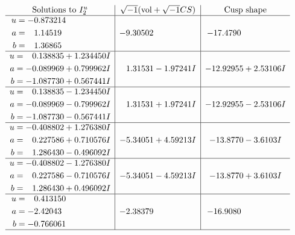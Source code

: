 \documentclass[1p]{elsarticle_modified}
\theoremstyle{definition}
\newcommand{\I}{\sqrt{-1}}
\begin{document}
$$\begin{array}{c|c|c}  
\text{Solutions to }I^u_{2}& \I (\text{vol} + \sqrt{-1}CS) & \text{Cusp shape}\\
 \hline 
\begin{aligned}
u &= -0.873214\phantom{ +0.000000I} \\
a &= \phantom{-}1.14519\phantom{ +0.000000I} \\
b &= \phantom{-}1.36865\phantom{ +0.000000I}\end{aligned}
 & -9.30502\phantom{ +0.000000I} & -17.4790\phantom{ +0.000000I} \\ \hline\begin{aligned}
u &= \phantom{-}0.138835 + 1.234450 I \\
a &= -0.089969 + 0.799962 I \\
b &= -1.087730 + 0.567441 I\end{aligned}
 & \phantom{-}1.31531 - 1.97241 I & -12.92955 + 2.53106 I \\ \hline\begin{aligned}
u &= \phantom{-}0.138835 - 1.234450 I \\
a &= -0.089969 - 0.799962 I \\
b &= -1.087730 - 0.567441 I\end{aligned}
 & \phantom{-}1.31531 + 1.97241 I & -12.92955 - 2.53106 I \\ \hline\begin{aligned}
u &= -0.408802 + 1.276380 I \\
a &= \phantom{-}0.227586 + 0.710576 I \\
b &= \phantom{-}1.286430 - 0.496092 I\end{aligned}
 & -5.34051 + 4.59213 I & -13.8770 - 3.6103 I \\ \hline\begin{aligned}
u &= -0.408802 - 1.276380 I \\
a &= \phantom{-}0.227586 - 0.710576 I \\
b &= \phantom{-}1.286430 + 0.496092 I\end{aligned}
 & -5.34051 - 4.59213 I & -13.8770 + 3.6103 I \\ \hline\begin{aligned}
u &= \phantom{-}0.413150\phantom{ +0.000000I} \\
a &= -2.42043\phantom{ +0.000000I} \\
b &= -0.766061\phantom{ +0.000000I}\end{aligned}
 & -2.38379\phantom{ +0.000000I} & -16.9080\phantom{ +0.000000I}\\
 \hline 
 \end{array}$$\newpage
\end{document}
